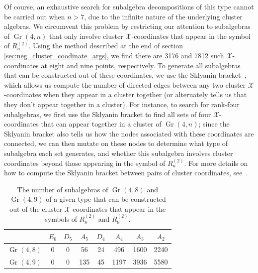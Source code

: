 \documentclass[11pt]{article}
\DeclareMathOperator{\Gr}{Gr}
\def\x{\mathcal{X}}
\begin{document}
Of course, an exhaustive search for subalgebra decompositions of this type cannot be carried out when $n>7$, due to the infinite nature of the underlying cluster algebras. We circumvent this problem by restricting our attention to subalgebras of $\Gr(4,n)$ that only involve cluster $\x$-coordinates that appear in the symbol of $R_n^{(2)}$\!. Using the method described at the end of section \ref{sec:neg_cluster_coodinate_args}, we find there are 3176 and 7812 such $\x$-coordinates at eight and nine points, respectively. To generate all subalgebras that can be constructed out of these coordinates, we use the Sklyanin bracket~\cite{Sklyanin:1982tf,GSV}, which allows us compute the number of directed edges between any two cluster $\x$-coordinates when they appear in a cluster together (or alternately tells us that they don't appear together in a cluster). For instance, to search for rank-four subalgebras, we first use the Sklyanin bracket to find all sets of four $\x$-coordinates that can appear together in a cluster of $\Gr(4,n)$; since the Sklyanin bracket also tells us how the nodes associated with these coordinates are connected, we can then mutate on these nodes to determine what type of subalgebra each set generates, and whether this subalgebra involves cluster coordinates beyond those appearing in the symbol of $R_n^{(2)}$\!. For more details on how to compute the Sklyanin bracket between pairs of cluster coordinates, see~\cite{Vergu:2015svm,Golden:2019kks}. 

\begin{table}
\begin{center}
\begin{tabular}{ c |  c | c | c | c | c | c | c }      
 \ & $E_6$ & $D_5$ & $A_5$ & $D_4$ & $A_4$ & $A_3$ & $A_2$  \\
\hline
$\Gr(4,8)$ & 0 & 0 & 56 & 24 & 496 & 1600 & 2240 \\ \hline
$\Gr(4,9)$ & 0  & 0 & 135 & 45 & 1197 & 3936 & 5580 
\end{tabular}
\end{center} 
\caption{The number of subalgebras of $\Gr(4,8)$ and $\Gr(4,9)$ of a given type that can be constructed out of the cluster $\x$-coordinates that appear in the symbols of $R_8^{(2)}$\! and $R_9^{(2)}$\!.}
\label{table:subalgebra_counts}
\end{table}
\end{document}
